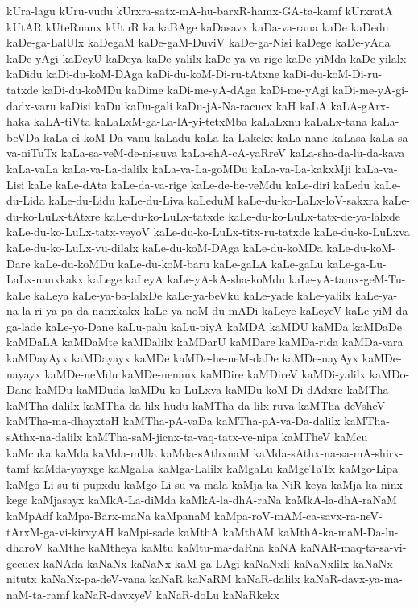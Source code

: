 {kUra-lagu
kUru-vudu
kUrxra-satx-mA-hu-barxR-hamx-GA-ta-kamf
kUrxratA
kUtAR
kUteRnanx
kUtuR
ka
kaBAge
kaDasavx
kaDa-va-rana
kaDe
kaDedu
kaDe-ga-LalUlx
kaDegaM
kaDe-gaM-DuviV
kaDe-ga-Nisi
kaDege
kaDe-yAda
kaDe-yAgi
kaDeyU
kaDeya
kaDe-yalilx
kaDe-ya-va-rige
kaDe-yiMda
kaDe-yilalx
kaDidu
kaDi-du-koM-DAga
kaDi-du-koM-Di-ru-tAtxne
kaDi-du-koM-Di-ru-tatxde
kaDi-du-koMDu
kaDime
kaDi-me-yA-dAga
kaDi-me-yAgi
kaDi-me-yA-gi-dadx-varu
kaDisi
kaDu
kaDu-gali
kaDu-jA-Na-racucx
kaH
kaLA
kaLA-gArx-haka
kaLA-tiVta
kaLaLxM-ga-La-lA-yi-tetxMba
kaLaLxnu
kaLaLx-tana
kaLa-beVDa
kaLa-ci-koM-Da-vanu
kaLadu
kaLa-ka-Lakekx
kaLa-nane
kaLasa
kaLa-sa-va-niTuTx
kaLa-sa-veM-de-ni-suva
kaLa-shA-cA-yaRreV
kaLa-sha-da-lu-da-kava
kaLa-vaLa
kaLa-va-La-dalilx
kaLa-va-La-goMDu
kaLa-va-La-kakxMji
kaLa-va-Lisi
kaLe
kaLe-dAta
kaLe-da-va-rige
kaLe-de-he-veMdu
kaLe-diri
kaLedu
kaLe-du-Lida
kaLe-du-Lidu
kaLe-du-Liva
kaLeduM
kaLe-du-ko-LaLx-loV-sakxra
kaLe-du-ko-LuLx-tAtxre
kaLe-du-ko-LuLx-tatxde
kaLe-du-ko-LuLx-tatx-de-ya-lalxde
kaLe-du-ko-LuLx-tatx-veyoV
kaLe-du-ko-LuLx-titx-ru-tatxde
kaLe-du-ko-LuLxva
kaLe-du-ko-LuLx-vu-dilalx
kaLe-du-koM-DAga
kaLe-du-koMDa
kaLe-du-koM-Dare
kaLe-du-koMDu
kaLe-du-koM-baru
kaLe-gaLA
kaLe-gaLu
kaLe-ga-Lu-LaLx-nanxkakx
kaLege
kaLeyA
kaLe-yA-kA-sha-koMdu
kaLe-yA-tamx-geM-Tu-kaLe
kaLeya
kaLe-ya-ba-lalxDe
kaLe-ya-beVku
kaLe-yade
kaLe-yalilx
kaLe-ya-na-la-ri-ya-pa-da-nanxkakx
kaLe-ya-noM-du-mADi
kaLeye
kaLeyeV
kaLe-yiM-da-ga-lade
kaLe-yo-Dane
kaLu-palu
kaLu-piyA
kaMDA
kaMDU
kaMDa
kaMDaDe
kaMDaLA
kaMDaMte
kaMDalilx
kaMDarU
kaMDare
kaMDa-rida
kaMDa-vara
kaMDayAyx
kaMDayayx
kaMDe
kaMDe-he-neM-daDe
kaMDe-nayAyx
kaMDe-nayayx
kaMDe-neMdu
kaMDe-nenanx
kaMDire
kaMDireV
kaMDi-yalilx
kaMDo-Dane
kaMDu
kaMDuda
kaMDu-ko-LuLxva
kaMDu-koM-Di-dAdxre
kaMTha
kaMTha-dalilx
kaMTha-da-lilx-hudu
kaMTha-da-lilx-ruva
kaMTha-deVsheV
kaMTha-ma-dhayxtaH
kaMTha-pA-vaDa
kaMTha-pA-va-Da-dalilx
kaMTha-sAthx-na-dalilx
kaMTha-saM-jicnx-ta-vaq-tatx-ve-nipa
kaMTheV
kaMcu
kaMcuka
kaMda
kaMda-mUla
kaMda-sAthxnaM
kaMda-sAthx-na-sa-mA-shirx-tamf
kaMda-yayxge
kaMgaLa
kaMga-Lalilx
kaMgaLu
kaMgeTaTx
kaMgo-Lipa
kaMgo-Li-su-ti-pupxdu
kaMgo-Li-su-va-mala
kaMja-ka-NiR-keya
kaMja-ka-ninx-kege
kaMjasayx
kaMkA-La-diMda
kaMkA-la-dhA-raNa
kaMkA-la-dhA-raNaM
kaMpAdf
kaMpa-Barx-maNa
kaMpanaM
kaMpa-roV-mAM-ca-savx-ra-neV-tArxM-ga-vi-kirxyAH
kaMpi-sade
kaMthA
kaMthAM
kaMthA-ka-maM-Da-lu-dharoV
kaMthe
kaMtheya
kaMtu
kaMtu-ma-daRna
kaNA
kaNAR-maq-ta-sa-vi-gecucx
kaNAda
kaNaNx
kaNaNx-kaM-ga-LAgi
kaNaNxli
kaNaNxlilx
kaNaNx-nitutx
kaNaNx-pa-deV-vana
kaNaR
kaNaRM
kaNaR-dalilx
kaNaR-davx-ya-ma-naM-ta-ramf
kaNaR-davxyeV
kaNaR-doLu
kaNaRkekx
}
